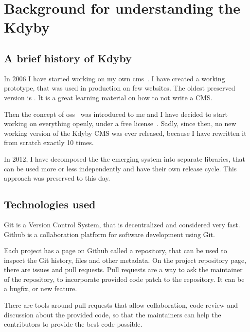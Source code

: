 \chapter{Background for understanding the Kdyby}

\section{A brief history of Kdyby} \label{sec:theory:kdyby-history}

In 2006 I have started working on my own \gls{cms}~\cite{wiki:cms}. I have created a working prototype, that was used in production on few websites. The oldest preserved version is . It is a great learning material on how to not write a CMS.

Then the concept of \gls{oss}~\cite{wiki:oss} was introduced to me and I have decided to start working on everything openly, under a free license~\cite{wiki:fsl}. Sadly, since then, no new working version of the Kdyby CMS was ever released, because I have rewritten it from scratch exactly 10 times.

In 2012, I have decomposed the the emerging system into separate libraries, that can be used more or less independently and have their own release cycle. This approach was preserved to this day.

\section{Technologies used}

 \label{sec:theory:git}

Git is a Version Control System, that is decentralized and considered very fast.~\cite{progit} Github is a collaboration platform for software development using Git.

Each project has a page on Github called a repository, that can be used to inspect the Git history, files and other metadata. On the project repository page, there are issues and pull requests. Pull requests are a way to ask the maintainer of the repository, to incorporate provided code patch to the repository. It can be a bugfix, or new feature.

There are tools around pull requests that allow collaboration, code review and discussion about the provided code, so that the maintainers can help the contributors to provide the best code possible.

